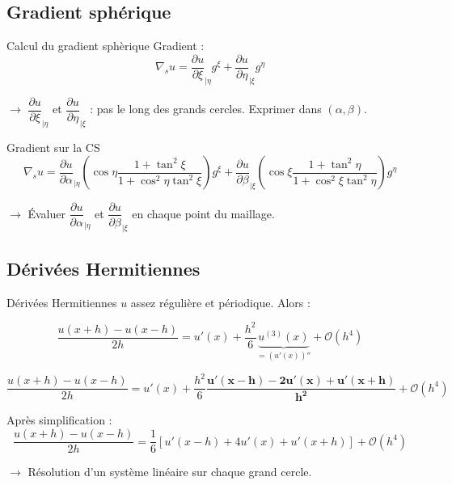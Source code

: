 \documentclass[11pt]{beamer}
\begin{document}
\subsection{Gradient sphérique}
\begin{frame}{Calcul du gradient sphèrique}
Gradient :
$$\nabla_s u = \dfrac{\partial u}{\partial \xi}_{|\eta} g^\xi + \dfrac{\partial u}{\partial \eta}_{|\xi} g^\eta $$

$\rightarrow$ $\dfrac{\partial u}{\partial \xi}_{|\eta}$ et $\dfrac{\partial u}{\partial \eta}_{|\xi}$ : pas le long des grands cercles. Exprimer dans $(\alpha, \beta)$.
\pause

\begin{block}{Gradient sur la CS}
$$\nabla_s u = \frac{\partial u}{\partial \alpha}_{|\eta} \left( \cos \eta \dfrac{1+ \tan^2 \xi}{1 + \cos^2 \eta \tan^2 \xi} \right) g^\xi + \frac{\partial u}{\partial \beta}_{|\xi} \left( \cos \xi \dfrac{1+ \tan^2 \eta}{1 + \cos^2 \xi \tan^2 \eta} \right) g^\eta $$
\end{block}

$\rightarrow$ Évaluer $\dfrac{\partial u}{\partial \alpha}_{|\eta}$ et $\dfrac{\partial u}{\partial \beta}_{|\xi}$ en chaque point du maillage.
\end{frame}



\subsection{Dérivées Hermitiennes}
\begin{frame}{Dérivées Hermitiennes}
$u$ assez régulière et périodique. Alors :

$$\dfrac{u(x+h)-u(x-h)}{2h} = u'(x) + \dfrac{h^2}{6} \underbrace{u^{(3)}(x)}_{= \left( u'(x) \right)''} + \mathcal{O}\left( h^4 \right)$$

\pause

$$\dfrac{u(x+h)-u(x-h)}{2h} = u'(x) + \dfrac{h^2}{6} \mathbf{ \dfrac{u'(x-h) - 2 u'(x) + u'(x+h) }{h^2}} + \mathcal{O}\left( h^4 \right)$$

\begin{block}{}
Après simplification :
$$\dfrac{u(x+h)-u(x-h)}{2h} = \dfrac{1}{6} \left[ u'(x-h) + 4 u'(x) + u'(x+h) \right] + \mathcal{O}\left( h^4 \right)$$
\end{block}

$\rightarrow$ Résolution d'un système linéaire sur chaque grand cercle.
\end{frame}
\end{document}
